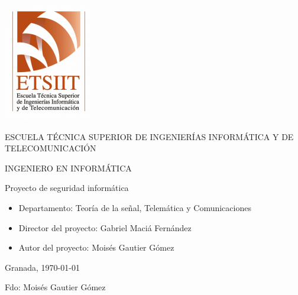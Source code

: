 \pagestyle{empty}
\begin{center}

  \includegraphics[scale=.2]{logo_ugr.png} \\

  \vspace{2.0cm}

  \Large{ESCUELA TÉCNICA SUPERIOR DE INGENIERÍAS INFORMÁTICA Y DE TELECOMUNICACIÓN} \\

  \vspace{1.0cm}

  \large{INGENIERO EN INFORMÁTICA} \\

  \vspace{2.0cm}

  \large{Proyecto de seguridad informática}

  \vspace{1.0cm}

\end{center}

\begin{itemize}
\item \large{Departamento: Teoría de la señal, Telemática y Comunicaciones}
\item \large{Director del proyecto: Gabriel Maciá Fernández}
\item \large{Autor del proyecto: Moisés Gautier Gómez}
\end{itemize}

\vspace{1.0cm}

\begin{flushright}
  \large{Granada, \today} \\

  \vspace{2.5cm}

  \large{Fdo: Moisés Gautier Gómez}
\end{flushright}
